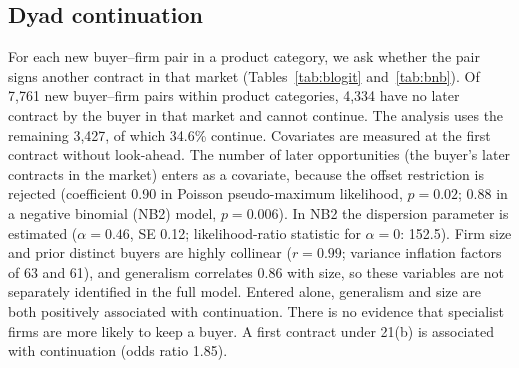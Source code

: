 \documentclass[11pt,a4paper]{article}
\begin{document}
\subsection{Dyad continuation}
For each new buyer--firm pair in a product category, we ask whether the pair signs another contract in that market (Tables~\ref{tab:blogit} and~\ref{tab:bnb}). Of 7,761 new buyer--firm pairs within product categories, 4,334 have no later contract by the buyer in that market and cannot continue. The analysis uses the remaining 3,427, of which 34.6\% continue. Covariates are measured at the first contract without look-ahead. The number of later opportunities (the buyer's later contracts in the market) enters as a covariate, because the offset restriction is rejected (coefficient 0.90 in Poisson pseudo-maximum likelihood, $p=0.02$; 0.88 in a negative binomial (NB2) model, $p=0.006$). In NB2 the dispersion parameter is estimated ($\alpha=0.46$, SE 0.12; likelihood-ratio statistic for $\alpha=0$: 152.5). Firm size and prior distinct buyers are highly collinear ($r=0.99$; variance inflation factors of 63 and 61), and generalism correlates 0.86 with size, so these variables are not separately identified in the full model. Entered alone, generalism and size are both positively associated with continuation. There is no evidence that specialist firms are more likely to keep a buyer. A first contract under 21(b) is associated with continuation (odds ratio 1.85).

\begin{table}[h]\centering\small\caption{Dyad continuation, logit (full specification; product-market and year fixed effects; two-way clustered 95\% CIs).}\label{tab:blogit}\end{table}
\begin{table}[h]\centering\small\caption{Number of later contracts, NB2 with estimated dispersion (full specification).}\label{tab:bnb}\end{table}
\end{document}
